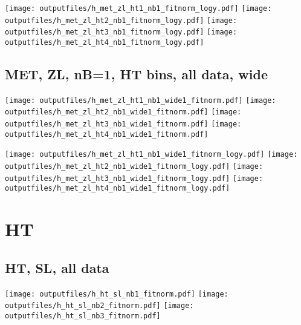\documentclass[11pt]{article}
\begin{document}
    \noindent
     \texttt{[image: outputfiles/h\_met\_zl\_ht1\_nb1\_fitnorm\_logy.pdf]}
     \texttt{[image: outputfiles/h\_met\_zl\_ht2\_nb1\_fitnorm\_logy.pdf]}
     \texttt{[image: outputfiles/h\_met\_zl\_ht3\_nb1\_fitnorm\_logy.pdf]}
     \texttt{[image: outputfiles/h\_met\_zl\_ht4\_nb1\_fitnorm\_logy.pdf]}


    \clearpage
     \subsection{ MET, ZL, nB=1, HT bins, all data, wide}

    \noindent
     \texttt{[image: outputfiles/h\_met\_zl\_ht1\_nb1\_wide1\_fitnorm.pdf]}
     \texttt{[image: outputfiles/h\_met\_zl\_ht2\_nb1\_wide1\_fitnorm.pdf]}
     \texttt{[image: outputfiles/h\_met\_zl\_ht3\_nb1\_wide1\_fitnorm.pdf]}
     \texttt{[image: outputfiles/h\_met\_zl\_ht4\_nb1\_wide1\_fitnorm.pdf]}

    \noindent
     \texttt{[image: outputfiles/h\_met\_zl\_ht1\_nb1\_wide1\_fitnorm\_logy.pdf]}
     \texttt{[image: outputfiles/h\_met\_zl\_ht2\_nb1\_wide1\_fitnorm\_logy.pdf]}
     \texttt{[image: outputfiles/h\_met\_zl\_ht3\_nb1\_wide1\_fitnorm\_logy.pdf]}
     \texttt{[image: outputfiles/h\_met\_zl\_ht4\_nb1\_wide1\_fitnorm\_logy.pdf]}


    \clearpage









   \section{HT}

    \subsection{ HT, SL, all data}

    \noindent
     \texttt{[image: outputfiles/h\_ht\_sl\_nb1\_fitnorm.pdf]}
     \texttt{[image: outputfiles/h\_ht\_sl\_nb2\_fitnorm.pdf]}
     \texttt{[image: outputfiles/h\_ht\_sl\_nb3\_fitnorm.pdf]}
\end{document}
